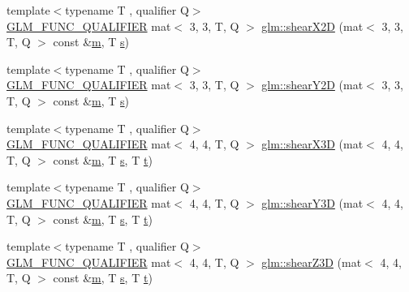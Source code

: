 \begin{DoxyCompactItemize}
\item 
{\footnotesize template$<$typename T , qualifier Q$>$ }\\\mbox{\hyperlink{setup_8hpp_a33fdea6f91c5f834105f7415e2a64407}{G\+L\+M\+\_\+\+F\+U\+N\+C\+\_\+\+Q\+U\+A\+L\+I\+F\+I\+ER}} mat$<$ 3, 3, T, Q $>$ \mbox{\hyperlink{group__gtx__transform2_gabf714b8a358181572b32a45555f71948}{glm\+::shear\+X2D}} (mat$<$ 3, 3, T, Q $>$ const \&\mbox{\hyperlink{_s_d_l__opengl__glext_8h_af593500c283bf1a787a6f947f503a5c2}{m}}, T \mbox{\hyperlink{_s_d_l__opengl_8h_a4af680a6c683f88ed67b76f207f2e6e4}{s}})
\item 
{\footnotesize template$<$typename T , qualifier Q$>$ }\\\mbox{\hyperlink{setup_8hpp_a33fdea6f91c5f834105f7415e2a64407}{G\+L\+M\+\_\+\+F\+U\+N\+C\+\_\+\+Q\+U\+A\+L\+I\+F\+I\+ER}} mat$<$ 3, 3, T, Q $>$ \mbox{\hyperlink{group__gtx__transform2_gac7998d0763d9181550c77e8af09a182c}{glm\+::shear\+Y2D}} (mat$<$ 3, 3, T, Q $>$ const \&\mbox{\hyperlink{_s_d_l__opengl__glext_8h_af593500c283bf1a787a6f947f503a5c2}{m}}, T \mbox{\hyperlink{_s_d_l__opengl_8h_a4af680a6c683f88ed67b76f207f2e6e4}{s}})
\item 
{\footnotesize template$<$typename T , qualifier Q$>$ }\\\mbox{\hyperlink{setup_8hpp_a33fdea6f91c5f834105f7415e2a64407}{G\+L\+M\+\_\+\+F\+U\+N\+C\+\_\+\+Q\+U\+A\+L\+I\+F\+I\+ER}} mat$<$ 4, 4, T, Q $>$ \mbox{\hyperlink{group__gtx__transform2_ga73e867c6cd4d700fe2054437e56106c4}{glm\+::shear\+X3D}} (mat$<$ 4, 4, T, Q $>$ const \&\mbox{\hyperlink{_s_d_l__opengl__glext_8h_af593500c283bf1a787a6f947f503a5c2}{m}}, T \mbox{\hyperlink{_s_d_l__opengl_8h_a4af680a6c683f88ed67b76f207f2e6e4}{s}}, T \mbox{\hyperlink{_s_d_l__opengl_8h_a7d65d00ca3b0630d9b5c52df855b19f5}{t}})
\item 
{\footnotesize template$<$typename T , qualifier Q$>$ }\\\mbox{\hyperlink{setup_8hpp_a33fdea6f91c5f834105f7415e2a64407}{G\+L\+M\+\_\+\+F\+U\+N\+C\+\_\+\+Q\+U\+A\+L\+I\+F\+I\+ER}} mat$<$ 4, 4, T, Q $>$ \mbox{\hyperlink{group__gtx__transform2_gade5bb65ffcb513973db1a1314fb5cfac}{glm\+::shear\+Y3D}} (mat$<$ 4, 4, T, Q $>$ const \&\mbox{\hyperlink{_s_d_l__opengl__glext_8h_af593500c283bf1a787a6f947f503a5c2}{m}}, T \mbox{\hyperlink{_s_d_l__opengl_8h_a4af680a6c683f88ed67b76f207f2e6e4}{s}}, T \mbox{\hyperlink{_s_d_l__opengl_8h_a7d65d00ca3b0630d9b5c52df855b19f5}{t}})
\item 
{\footnotesize template$<$typename T , qualifier Q$>$ }\\\mbox{\hyperlink{setup_8hpp_a33fdea6f91c5f834105f7415e2a64407}{G\+L\+M\+\_\+\+F\+U\+N\+C\+\_\+\+Q\+U\+A\+L\+I\+F\+I\+ER}} mat$<$ 4, 4, T, Q $>$ \mbox{\hyperlink{group__gtx__transform2_ga6591e0a3a9d2c9c0b6577bb4dace0255}{glm\+::shear\+Z3D}} (mat$<$ 4, 4, T, Q $>$ const \&\mbox{\hyperlink{_s_d_l__opengl__glext_8h_af593500c283bf1a787a6f947f503a5c2}{m}}, T \mbox{\hyperlink{_s_d_l__opengl_8h_a4af680a6c683f88ed67b76f207f2e6e4}{s}}, T \mbox{\hyperlink{_s_d_l__opengl_8h_a7d65d00ca3b0630d9b5c52df855b19f5}{t}})

\end{DoxyCompactItemize}
